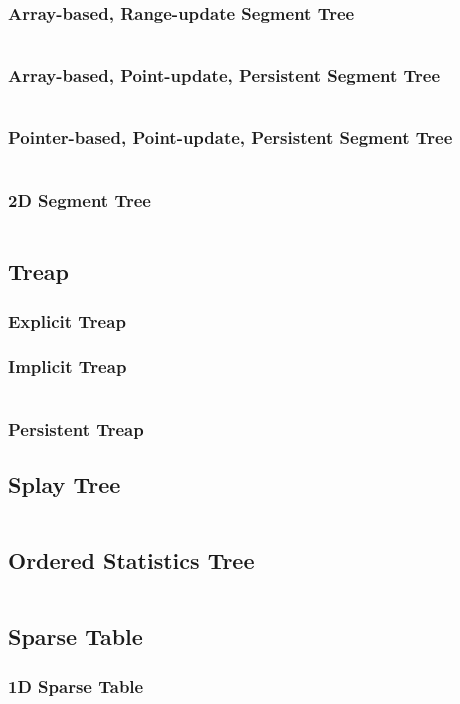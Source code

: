 \documentclass[8pt,a4paper,landscape,oneside]{amsart}
\newcommand{\code}[1]{\inputminted[fontsize=\normalsize,baselinestretch=1]{cpp}{_code/#1}}
\begin{document}
\begin{multicols*}{3}
    \subsubsection{Array-based, Range-update Segment Tree}
      \code{data-structures/segtree_array_lazy.cpp}
    \subsubsection{Array-based, Point-update, Persistent Segment Tree}
      \code{data-structures/segtree_persistent_iter.cpp}
    \subsubsection{Pointer-based, Point-update, Persistent Segment Tree}
      \code{data-structures/segtree_persistent_rec.cpp}
    \subsubsection{2D Segment Tree}
      \code{data-structures/segtree_2d.cpp}
  \subsection{Treap}
		\subsubsection{Explicit Treap}
		\subsubsection{Implicit Treap}
			\code{data-structures/treap_implicit.cpp}
		\subsubsection{Persistent Treap}
  \subsection{Splay Tree}
    \code{data-structures/splay.cpp}
	\subsection{Ordered Statistics Tree}
    \code{data-structures/ordered_statistics_tree.cpp}
	\subsection{Sparse Table}
    \subsubsection{1D Sparse Table}
      \code{data-structures/sparse.cpp}

\end{multicols*}
\end{document}
